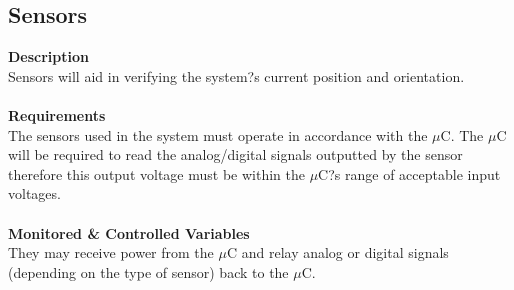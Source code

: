 \documentclass[titlepage]{article}
\begin{document}
\subsection{Sensors}
\textbf{Description}\\
Sensors will aid in verifying the system?s current position and orientation.\\\\
\textbf{Requirements}\\
The sensors used in the system must operate in accordance with the $\mu$C. The $\mu$C will be required to read the analog/digital signals outputted by the sensor therefore this output voltage must be within the $\mu$C?s range of acceptable input voltages.\\\\
\textbf{Monitored \& Controlled Variables}\\
They may receive power from the $\mu$C and relay analog or digital signals (depending on the type of sensor) back to the $\mu$C.
\end{document}
